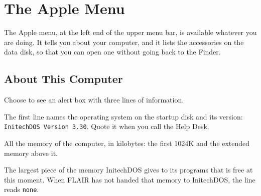 \chapter{The Apple Menu}
\label{ch:apple}

The Apple menu, at the left end of the upper menu bar, is available
whatever you are doing.  It tells you about your computer, and it lists the
accessories on the data disk, so that you can open one without going back
to the Finder.


\section{About This Computer}
Choose  to see an alert box with three
lines of information.


The first line names the operating system on the
startup disk and its version: \texttt{InitechDOS Version 3.30}.  Quote it
when you call the Help Desk.

All the memory of the computer, in kilobytes:
the first 1024K and the extended memory above it.

The largest piece of the memory InitechDOS
gives to its programs that is free at this moment.  When FLAIR has not
handed that memory to InitechDOS, the line reads \texttt{none}.

